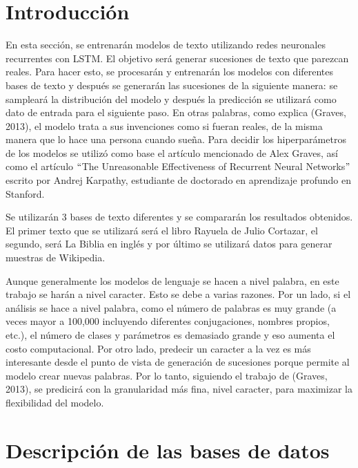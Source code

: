 \section{Introducción}
En esta sección, se entrenarán modelos de texto utilizando redes neuronales recurrentes con LSTM. El objetivo será generar sucesiones de texto que parezcan reales. Para hacer esto, se procesarán y entrenarán los modelos con diferentes bases de texto y después se generarán las sucesiones de la siguiente manera: se sampleará la distribución del modelo y después la predicción se utilizará como dato de entrada para el siguiente paso. En otras palabras, como explica (Graves, 2013), el modelo trata a sus invenciones como si fueran reales, de la misma manera que lo hace una persona cuando sueña. Para decidir los hiperparámetros de los modelos se utilizó como base el artículo mencionado de Alex Graves, así como el artículo $``$The Unreasonable Effectiveness of Recurrent Neural Networks$"$ escrito por Andrej Karpathy, estudiante de doctorado en aprendizaje profundo en Stanford.
\cite{DBLP:journals/corr/Graves13}
\cite{unreasonable}

\vspace{1em}

Se utilizarán 3 bases de texto diferentes y se compararán los resultados obtenidos. El primer texto que se utilizará será el libro Rayuela de Julio Cortazar, el segundo, será La Biblia en inglés y por último se utilizará datos para generar muestras de Wikipedia.

\vspace{1em}

Aunque generalmente los modelos de lenguaje se hacen a nivel palabra, en este trabajo se harán a nivel caracter. Esto se debe a varias razones. Por un lado, si el análisis se hace a nivel palabra, como el número de palabras es muy grande (a veces mayor a 100,000 incluyendo diferentes conjugaciones, nombres propios, etc.), el número de clases y parámetros es demasiado grande y eso aumenta el costo computacional. Por otro lado, predecir un caracter a la vez es más interesante desde el punto de vista de generación de sucesiones porque permite al modelo crear nuevas palabras. Por lo tanto, siguiendo el trabajo de (Graves, 2013), se predicirá con la granularidad más fina, nivel caracter, para maximizar la flexibilidad del modelo.
\cite{DBLP:journals/corr/Graves13}

\section{Descripción de las bases de datos}

